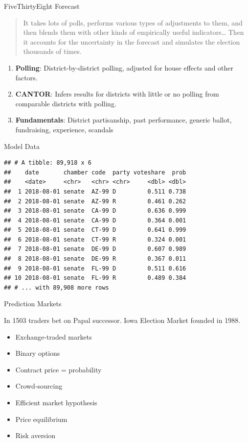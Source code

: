 \documentclass[ignorenonframetext,]{beamer}
\providecommand{\tightlist}{%
  \setlength{\itemsep}{0pt}\setlength{\parskip}{0pt}}
\begin{document}
\begin{frame}{FiveThirtyEight Forecast}

\begin{quote}
It takes lots of polls, performs various types of adjustments to them,
and then blends them with other kinds of empirically useful
indicators\ldots{} Then it accounts for the uncertainty in the forecast
and simulates the election thousands of times.
\end{quote}

\begin{enumerate}
\def\labelenumi{\arabic{enumi}.}
\tightlist
\item
  \textbf{Polling}: District-by-district polling, adjusted for house
  effects and other factors.
\item
  \textbf{CANTOR}: Infers results for districts with little or no
  polling from comparable districts with polling.
\item
  \textbf{Fundamentals}: District partisanship, past performance,
  generic ballot, fundraising, experience, scandals
\end{enumerate}

\end{frame}

\begin{frame}[fragile]{Model Data}

\begin{verbatim}
## # A tibble: 89,918 x 6
##    date       chamber code  party voteshare  prob
##    <date>     <chr>   <chr> <chr>     <dbl> <dbl>
##  1 2018-08-01 senate  AZ-99 D         0.511 0.738
##  2 2018-08-01 senate  AZ-99 R         0.461 0.262
##  3 2018-08-01 senate  CA-99 D         0.636 0.999
##  4 2018-08-01 senate  CA-99 D         0.364 0.001
##  5 2018-08-01 senate  CT-99 D         0.641 0.999
##  6 2018-08-01 senate  CT-99 R         0.324 0.001
##  7 2018-08-01 senate  DE-99 D         0.607 0.989
##  8 2018-08-01 senate  DE-99 R         0.367 0.011
##  9 2018-08-01 senate  FL-99 D         0.511 0.616
## 10 2018-08-01 senate  FL-99 R         0.489 0.384
## # ... with 89,908 more rows
\end{verbatim}

\end{frame}

\begin{frame}{Prediction Markets}

In 1503 traders bet on Papal successor. Iowa Election Market founded in
1988.

\begin{itemize}
\tightlist
\item
  Exchange-traded markets
\item
  Binary options
\item
  Contract price = probability
\item
  Crowd-sourcing
\item
  Efficient market hypothesis
\item
  Price equilibrium
\item
  Risk aversion
\end{itemize}

\end{frame}
\end{document}
